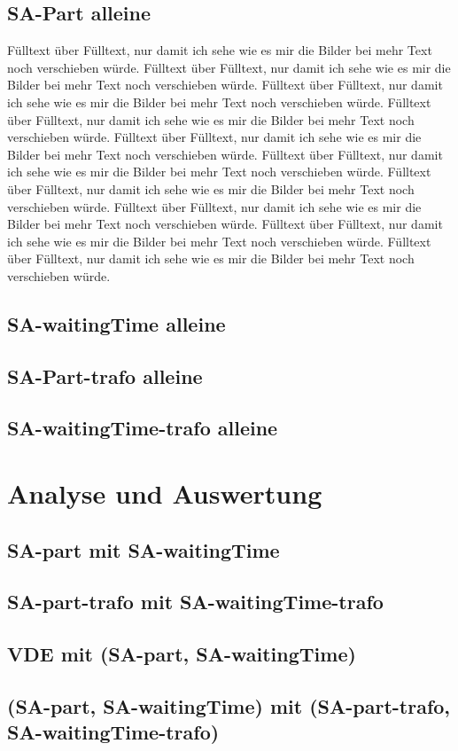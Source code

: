 \subsection{SA-Part alleine}
Fülltext über Fülltext, nur damit ich sehe wie es mir die Bilder bei mehr Text noch verschieben würde. Fülltext über Fülltext, nur damit ich sehe wie es mir die Bilder bei mehr Text noch verschieben würde. Fülltext über Fülltext, nur damit ich sehe wie es mir die Bilder bei mehr Text noch verschieben würde. Fülltext über Fülltext, nur damit ich sehe wie es mir die Bilder bei mehr Text noch verschieben würde. Fülltext über Fülltext, nur damit ich sehe wie es mir die Bilder bei mehr Text noch verschieben würde. Fülltext über Fülltext, nur damit ich sehe wie es mir die Bilder bei mehr Text noch verschieben würde. Fülltext über Fülltext, nur damit ich sehe wie es mir die Bilder bei mehr Text noch verschieben würde. Fülltext über Fülltext, nur damit ich sehe wie es mir die Bilder bei mehr Text noch verschieben würde. Fülltext über Fülltext, nur damit ich sehe wie es mir die Bilder bei mehr Text noch verschieben würde. Fülltext über Fülltext, nur damit ich sehe wie es mir die Bilder bei mehr Text noch verschieben würde.
\subsection{SA-waitingTime alleine}
\subsection{SA-Part-trafo alleine}
\subsection{SA-waitingTime-trafo alleine}
\section{Analyse und Auswertung}
\subsection{SA-part mit SA-waitingTime}
\subsection{SA-part-trafo mit SA-waitingTime-trafo}
\subsection{VDE mit (SA-part, SA-waitingTime)}
\subsection{(SA-part, SA-waitingTime) mit (SA-part-trafo, SA-waitingTime-trafo)}
